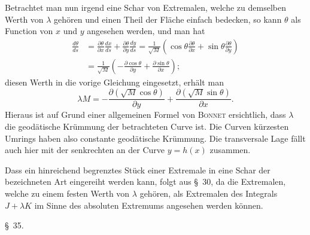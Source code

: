 \documentclass[11pt,a4paper,leqno]{article}
\begin{document}
Betrachtet man nun irgend eine Schar von Extremalen, welche zu demselben Werth von $\lambda$ gehören und einen Theil der Fläche einfach bedecken, so kann $\theta$ als Function von $x$ und $y$ angesehen werden, und man hat
\[
\begin{aligned}
\frac{d\theta}{ds}&=\frac{\partial\theta}{\partial x}\frac{dx}{ds}+
\frac{\partial\theta}{\partial y}\frac{dy}{ds}
=\frac{1}{\sqrt{M}}\left(\cos\theta\frac{\partial\theta}{\partial x}+
\sin\theta\frac{\partial\theta}{\partial y}\right)\\
&=\frac{1}{\sqrt{M}}\left(-\frac{\partial\cos\theta}{\partial y}+
\frac{\partial\sin\theta}{\partial x}\right);
\end{aligned}
\]
diesen Werth in die vorige Gleichung eingesetzt, erhält man
\[
\lambda M=-\frac{\partial(\sqrt{M}\cos\theta)}{\partial y}+
\frac{\partial(\sqrt{M}\sin\theta)}{\partial x}.
\]
Hieraus ist auf Grund einer allgemeinen Formel von \textsc{Bonnet} ersichtlich, dass $\lambda$ die geodätische Krümmung der betrachteten Curve ist. Die Curven kürzesten Umrings haben also constante geodätische Krümmung. Die transversale Lage fällt auch hier mit der senkrechten an der Curve $y=h(x)$ zusammen.

Dass ein hinreichend begrenztes Stück einer Extremale in eine Schar der bezeichneten Art eingereiht werden kann, folgt aus \S~30, da die Extremalen, welche zu einem festen Werth von $\lambda$ gehören, als Extremalen des Integrals $J+\lambda K$ im Sinne des absoluten Extremums angesehen werden können.

\begin{center}{\large \S~35.}\end{center}
\end{document}
